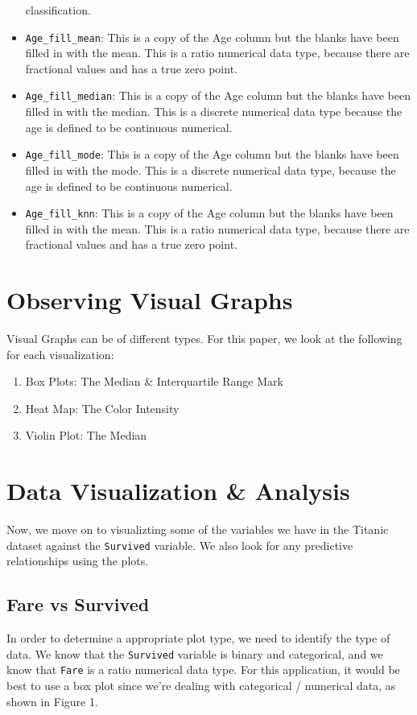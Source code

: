 \documentclass[a4paper, twocolumn]{article}
\begin{document}
\begin{itemize}
    classification.
    \item \texttt{Age\_fill\_mean}: This is a copy of the Age column but the blanks have been filled in with the mean.
    This is a ratio numerical data type, because there are  fractional values and has a true zero point.
    \item \texttt{Age\_fill\_median}: This is a copy of the Age column but the blanks have been filled in with the
    median. This is a discrete numerical data type because the age is defined to be continuous numerical.
    \item \texttt{Age\_fill\_mode}: This is a copy of the Age column but the blanks have been filled in with the mode.
    This is a discrete numerical data type, because the age is defined to be continuous numerical.
    \item \texttt{Age\_fill\_knn}: This is a copy of the Age column but the blanks have been filled in with the mean.
    This is a ratio numerical data type, because there are fractional values and has a true zero point.
\end{itemize}


\section{Observing Visual Graphs}
Visual Graphs can be of different types. For this paper, we look at the following for each visualization:
\begin{enumerate}
    \item Box Plots: The Median \& Interquartile Range Mark
    \item Heat Map: The Color Intensity
    \item Violin Plot: The Median
\end{enumerate}

\section{Data Visualization \& Analysis}
Now, we move on to visualizting some of the variables we have in the Titanic dataset against the \texttt{Survived}
variable. We also look for any predictive relationships using the plots.

\subsection{Fare vs Survived}
In order to determine a appropriate plot type, we need to identify the type of data. We know that the 
\texttt{Survived} variable is binary and categorical, and we know that \texttt{Fare} is a ratio numerical data type.
For this application, it would be best to use a box plot since we're dealing with categorical / numerical data, as 
shown in Figure 1.
\end{document}
